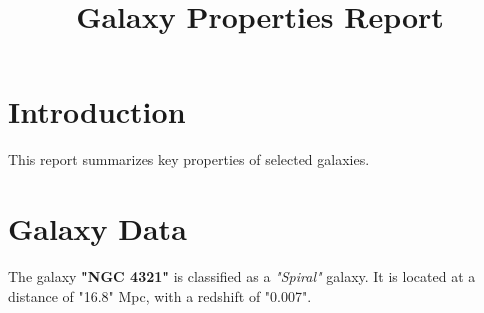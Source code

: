 \documentclass{article}
\title{Galaxy Properties Report}
\author{}
\date{}
\begin{document}
\maketitle

\section{Introduction}
This report summarizes key properties of selected galaxies.

\section{Galaxy Data}
The galaxy \textbf{"NGC 4321"} is classified as a \textit{"Spiral"} galaxy. 
It is located at a distance of "16.8" Mpc, with a redshift of "0.007".
\end{document}
